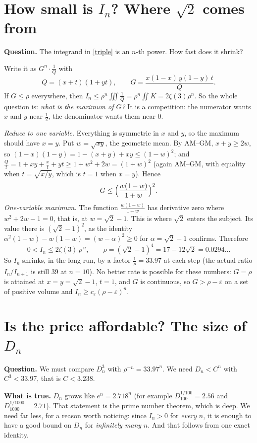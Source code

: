 \documentclass[11pt]{article}
\theoremstyle{remark}
\newcommand{\q}[1]{\medskip\noindent\textbf{#1}}
\begin{document}
\section{How small is $I_n$? Where $\sqrt2$ comes from}

\q{Question.} The integrand in \eqref{triple} is an $n$-th power. How fast does it shrink?

Write it as $G^n\cdot\frac1Q$ with
\[
Q=(x+t)(1+yt),\qquad G=\frac{x(1-x)\,y(1-y)\,t}{Q}.
\]
If $G\le\rho$ everywhere, then $I_n\le\rho^n\iiint\frac1Q=\rho^n\iint K=2\zeta(3)\rho^n$. So the
whole question is: \emph{what is the maximum of $G$?} It is a competition: the numerator wants $x$
and $y$ near $\frac12$, the denominator wants them near $0$.

\emph{Reduce to one variable.} Everything is symmetric in $x$ and $y$, so the maximum should have $x=y$. Put $w=\sqrt{xy}$,
the geometric mean. By AM--GM, $x+y\ge2w$, so
$(1-x)(1-y)=1-(x+y)+xy\le(1-w)^2$; and $\frac Qt=1+xy+\frac xt+yt\ge1+w^2+2w=(1+w)^2$ (again
AM--GM, with equality when $t=\sqrt{x/y}$, which is $t=1$ when $x=y$). Hence
\[
G\le\Bigl(\frac{w(1-w)}{1+w}\Bigr)^2 .
\]
\emph{One-variable maximum.} The function $\frac{w(1-w)}{1+w}$ has derivative zero where
$w^2+2w-1=0$, that is, at $w=\sqrt2-1$. This is where $\sqrt2$ enters the subject. Its value there
is $(\sqrt2-1)^2$, as the identity $\alpha^2(1+w)-w(1-w)=(w-\alpha)^2\ge0$ for $\alpha=\sqrt2-1$
confirms. Therefore
\begin{equation}\label{boundA}
\boxed{\;0<I_n\le2\zeta(3)\,\rho^{\,n},\qquad\rho=(\sqrt2-1)^4=17-12\sqrt2=0.0294\ldots\;}
\end{equation}
So $I_n$ shrinks, in the long run, by a factor $\frac1\rho=33.97$ at each step (the actual ratio
$I_n/I_{n+1}$ is still $39$ at $n=10$). No better rate is possible for these numbers: $G=\rho$ is
attained at $x=y=\sqrt2-1$, $t=1$, and $G$ is continuous, so $G>\rho-\varepsilon$ on a set of
positive volume and $I_n\ge c_\varepsilon(\rho-\varepsilon)^n$.

\section{Is the price affordable? The size of $D_n$}

\q{Question.} We must compare $D_n^3$ with $\rho^{-n}=33.97^n$. We need $D_n<C^n$ with
$C^3<33.97$, that is $C<3.238$.

\q{What is true.} $D_n$ grows like $e^n=2.718^n$ (for example $D_{100}^{1/100}=2.56$ and
$D_{1000}^{1/1000}=2.71$). That statement is the prime number theorem, which is deep. We need far less, for a reason worth
noticing: since $I_n>0$ for \emph{every} $n$, it is enough to have a good bound on $D_n$ for
\emph{infinitely many} $n$. And that follows from one exact identity.
\end{document}
